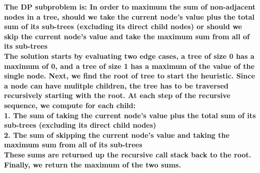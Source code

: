 \documentclass{hw_template}
\begin{document}
\begin{problem}
\textbf{The DP subproblem is: In order to maximum the sum of non-adjacent nodes in a tree, should we
take the current node's value plus the total sum of its sub-trees (excluding its direct child nodes) or should we 
skip the current node's value and take the maximum sum from all of its sub-trees}\\

\textbf{The solution starts by evaluating two edge cases, a tree of size 0 has a maximum of 0, and a tree of size 1 has
a maximum of the value of the single node. Next, we find the root of tree to start the heuristic. Since a node can 
have mulitple children, the tree has to be traversed recursively starting with the root. At each step of the recursive sequence,
we compute for each child:}\\
\textbf{1. The sum of taking the current node's value plus the total sum of its sub-trees (excluding its direct child nodes)}\\
\textbf{2. The sum of skipping the current node's value and taking the maximum sum from all of its sub-trees}\\
\textbf{These sums are returned up the recursive call stack back to the root. Finally, we return the maximum of the two sums.}\\\\

\end{problem}
\end{document}
